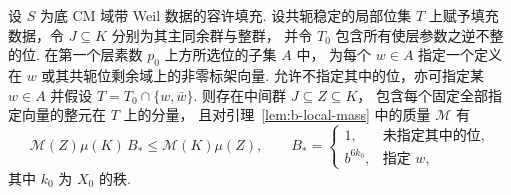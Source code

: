\begin{lemma}[单个所选位的固定向量增益]
\label{lem:b-fixed-one-place}
\emitthmsource
设 $S$ 为底 CM 域带 Weil 数据的容许填充.
设共轭稳定的局部位集 $T$ 上赋予填充数据，令 $J\subseteq K$ 分别为其主同余群与整群，
并令 $T_0$ 包含所有使层参数之逆不整的位.
在第一个层素数 $p_0$ 上方所选位的子集 $A$ 中，
为每个 $w\in A$ 指定一个定义在 $w$ 或其共轭位剩余域上的非零标架向量.
允许不指定其中的位，亦可指定某 $w\in A$ 并假设 $T=T_0\cap\{w,\bar w\}$.
则存在中间群 $J\subseteq Z\subseteq K$，
包含每个固定全部指定向量的整元在 $T$ 上的分量，
且对引理~\ref{lem:b-local-mass} 中的质量 $\mathcal M$ 有
\[
  \mathcal M(Z)\mu(K)\,B_*
     \le \mathcal M(K)\mu(Z),
 \qquad B_*=
 \begin{cases}
  1,&\text{未指定其中的位},\\
  b^{6k_0},&\text{指定 } w,
 \end{cases}
\]
其中 $k_0$ 为 $X_0$ 的秩.
\end{lemma}
